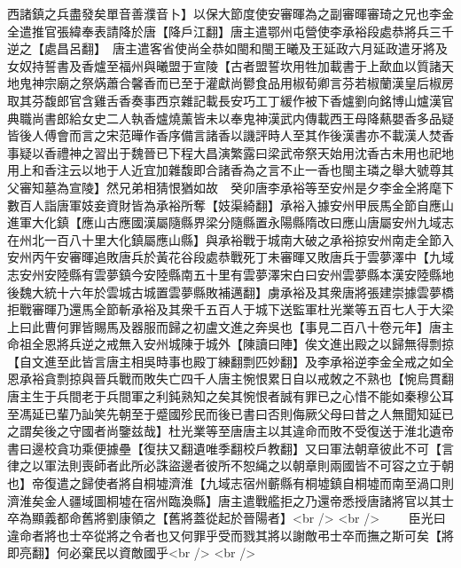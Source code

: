 西諸鎮之兵盡發矣單音善濮音卜】以保大節度使安審暉為之副審暉審琦之兄也李金全遣推官張緯奉表請降於唐【降戶江翻】唐主遣鄂州屯營使李承裕段處恭將兵三千逆之【處昌呂翻】　唐主遣客省使尚全恭如閩和閩王曦及王延政六月延政遣牙將及女奴持誓書及香爐至福州與曦盟于宣陵【古者盟誓坎用牲加載書于上歃血以質諸天地鬼神宗廟之祭焫蕭合馨香而已至于灌獻尚鬰食品用椒荀卿言芬若椒蘭漢皇后椒房取其芬馥郎官含雞舌香奏事西京雜記載長安巧工丁緩作被下香爐劉向銘博山爐漢官典職尚書郎給女史二人執香爐燒薰皆未以奉鬼神漢武内傳載西王母降爇嬰香多品疑皆後人傅會而言之宋范曄作香序備言諸香以譏評時人至其作後漢書亦不載漢人焚香事疑以香禮神之習出于魏晉已下程大昌演繁露曰梁武帝祭天始用沈香古未用也祀地用上和香注云以地于人近宜加雜馥即合諸香為之言不止一香也閩主璘之舉大號尊其父審知墓為宣陵】然兄弟相猜恨猶如故　癸卯唐李承裕等至安州是夕李金全將麾下數百人詣唐軍妓妾資財皆為承裕所奪【妓渠綺翻】承裕入據安州甲辰馬全節自應山進軍大化鎮【應山古應國漢屬隨縣界梁分隨縣置永陽縣隋改曰應山唐屬安州九域志在州北一百八十里大化鎮屬應山縣】與承裕戰于城南大破之承裕掠安州南走全節入安州丙午安審暉追敗唐兵於黃花谷段處恭戰死丁未審暉又敗唐兵于雲夢澤中【九域志安州安陸縣有雲夢鎮今安陸縣南五十里有雲夢澤宋白曰安州雲夢縣本漢安陸縣地後魏大統十六年於雲城古城置雲夢縣敗補邁翻】虜承裕及其衆唐將張建崇據雲夢橋拒戰審暉乃還馬全節斬承裕及其衆千五百人于城下送監軍杜光業等五百七人于大梁上曰此曹何罪皆賜馬及器服而歸之初盧文進之奔吳也【事見二百八十卷元年】唐主命祖全恩將兵逆之戒無入安州城陳于城外【陳讀曰陣】俟文進出殿之以歸無得剽掠【自文進至此皆言唐主相吳時事也殿丁練翻剽匹妙翻】及李承裕逆李金全戒之如全恩承裕貪剽掠與晉兵戰而敗失亡四千人唐主惋恨累日自以戒敇之不熟也【惋烏貫翻唐主生于兵間老于兵間軍之利鈍熟知之矣其惋恨者誠有罪已之心惜不能如秦穆公耳至馮延已輩乃訕笑先朝至于蹙國殄民而後已書曰否則侮厥父母曰昔之人無聞知延已之謂矣後之守國者尚鑒兹哉】杜光業等至唐唐主以其違命而敗不受復送于淮北遺帝書曰邊校貪功乘便據壘【復扶又翻遺唯季翻校戶教翻】又曰軍法朝章彼此不可【言律之以軍法則喪師者此所必誅盜邊者彼所不恕䋲之以朝章則兩國皆不可容之立于朝也】帝復遣之歸使者將自桐墟濟淮【九域志宿州蘄縣有桐墟鎮自桐墟而南至渦口則濟淮矣金人疆域圖桐墟在宿州臨渙縣】唐主遣戰艦拒之乃還帝悉授唐諸將官以其士卒為顯義都命舊將劉康領之【舊將蓋從起於晉陽者】<br />
<br />
　　臣光曰違命者將也士卒從將之令者也又何罪乎受而戮其將以謝敵弔士卒而撫之斯可矣【將即亮翻】何必棄民以資敵國乎<br />
<br />

